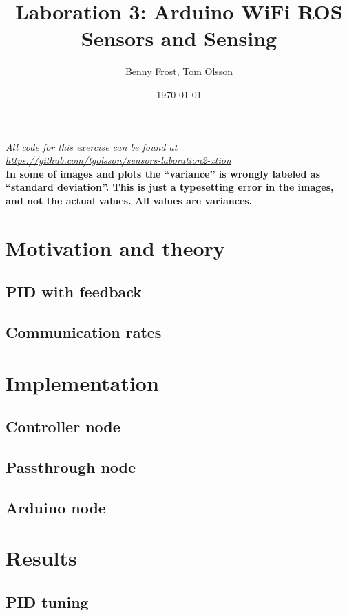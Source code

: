\documentclass[11pt]{article}
\title{Laboration 3: Arduino WiFi ROS\\ {\small Sensors and Sensing}} \author{Benny Frost, Tom Olsson}
\date{\today}
\begin{document}
\maketitle %
\begin{center}
  \emph{All code for this exercise can be found at \\ \url{https://github.com/tgolsson/sensors-laboration2-xtion}} \\ \vspace{10pt}
  \textbf{\Large In some of images and plots the ``variance'' is wrongly labeled as
    ``standard deviation''. This is just a typesetting error in the images, and
    not the actual values. All values are variances.}
\end{center}
\tableofcontents
\lstlistoflistings %
\listoffigures %
\listoftables \lstset{
  matchrangestart=t} %


\section{Motivation and theory}
\subsection{PID with feedback}
\subsection{Communication rates}
\label{subsec:cr}
\section{Implementation}
\subsection{Controller node}
\label{subsec:cn}


\subsection{Passthrough node}
\label{subsec:ptn}

\subsection{Arduino node}
\label{subsec:dd}

\section{Results}
\subsection{PID tuning}
\label{subsec:pidt}
\end{document}
